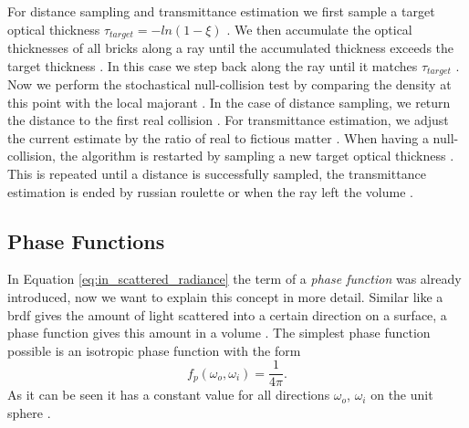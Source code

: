 For distance sampling and transmittance estimation we first sample a target optical thickness $\tau_{target}=-ln(1-\xi)$ \cite{brick_grid}.
We then accumulate the optical thicknesses of all bricks along a ray until the accumulated thickness exceeds the target thickness \cite{brick_grid}.
In this case we step back along the ray until it matches $\tau_{target}$ \cite{brick_grid}.
Now we perform the stochastical null-collision test by comparing the density at this point with the local majorant \cite{brick_grid}.
In the case of distance sampling, we return the distance to the first real collision \cite{brick_grid}.
For transmittance estimation, we adjust the current estimate by the ratio of real to fictious matter \cite{brick_grid}.
When having a null-collision, the algorithm is restarted by sampling a new target optical thickness \cite{brick_grid}.
This is repeated until a distance is successfully sampled, the transmittance estimation is ended by russian roulette or when the ray left the volume \cite{brick_grid}.

\subsection{Phase Functions}
\label{subsec:phase_function}
In Equation \ref{eq:in_scattered_radiance} the term of a \textit{phase function} was already introduced, now we want to explain this concept in more detail.
Similar like a \acs{brdf} gives the amount of light scattered into a certain direction on a surface, a phase function gives this amount in a volume \cite{novak_overview}.
The simplest phase function possible is an isotropic phase function with the form
\begin{equation}
    f_p(\omega_o, \omega_i)=\frac{1}{4\pi}.
\end{equation}
As it can be seen it has a constant value for all directions $\omega_o$, $\omega_i$ on the unit sphere \cite{novak_overview}.

